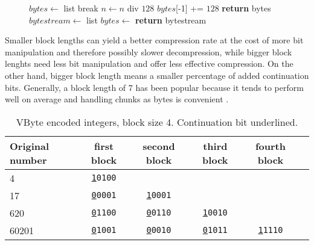 \begin{figure}[ht]
\centering
  \begin{minipage}{0.5\linewidth}
\begin{algorithmic}[H]
\State $bytes\gets $ list
\State {}
 \State break \EndIf
\State $n\gets n$ div $128$
\EndWhile
\State $bytes$[-1] += $128$
\State \textbf{return} bytes
\EndFunction
\medskip
\medskip
{}
\State $bytestream\gets $ list
\State $bytes \gets$ 
\State {}
\EndFor
\State \textbf{return} bytestream
\EndFunction

\end{algorithmic}
\end{minipage}
 \label{vbyte_enc}
\end{figure}

Smaller block lengths can yield a better compression rate at the cost of more bit manipulation and therefore possibly slower decompression, while bigger block lenghts need less bit manipulation and 
offer less effective compression. On the other hand, bigger block length means a smaller percentage of added continuation bits.
Generally, a block length of 7 has been popular because it tends to perform well on average and handling chunks as bytes is 
convenient \citep{Man08}.


\begin{table}
\centering
\begin{tabular}{l||c c c c c} 
Original number & first block & second block & third block & fourth block &\\ 
\hline \hline 
4  & \texttt{\underline{1}0100}    &                             &                           &  &  \\
17  & \texttt{\underline{0}0001}   & \texttt{\underline{1}0001}  &                           &  &  \\
620  & \texttt{\underline{0}1100}  & \texttt{\underline{0}0110} & \texttt{\underline{1}0010} &  &  \\
60201 & \texttt{\underline{0}1001} & \texttt{\underline{0}0010} & \texttt{\underline{0}1011} & \texttt{\underline{1}1110} &  \\

\hline
\end{tabular}
\caption{VByte encoded integers, block size 4. Continuation bit underlined.\label{table:vbytes}}
\end{table}

